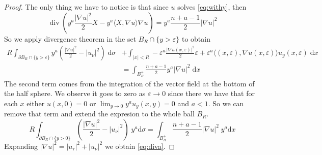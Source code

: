 \documentclass[letterpaper]{article}
\numberwithin{equation}{section}
\newcommand{\abs}[1]{\left\vert#1\right\vert}
\newcommand{\eps}{\varepsilon}
\newcommand{\grad} {\nabla}
\newcommand{\bdary} {\partial}
\newcommand{\dx} {\; \mathrm{d} x}
\newcommand{\dd} {\; \mathrm{d}}
\DeclareMathOperator{\dv}{div}
\newcommand{\party}[1] {#1_y}
\newcommand{\ydd} {\; y^a \mathrm{d}}
\begin{document}
\begin{proof}
The only thing we have to notice is that since $u$ solves \eqref{eq:withy}, then 
\[ \dv \left( y^a \frac{\abs{ \grad u }^2 }{2} X - y^a \langle X , \grad u \rangle \grad u \right) = y^a \frac{n+a-1}{2} \abs{ \grad u }^2 \]
So we apply divergence theorem in the set $B_R \cap \{y > \eps\}$ to obtain
\[ \begin{split}
R \int_{\bdary B_R \cap \{y> \eps \}} y^a \left( \frac{\abs{\grad u}^2} 2 - \abs{u_\nu}^2 \right) \dd \sigma &+ \int_{\abs{x}<R} -\eps^a \frac{\abs{ \grad u(x,\eps) }^2 }{2} \eps + \eps^a \langle (x,\eps),\grad u(x,\eps) \rangle \party u(x,\eps) \dx \\ &= \int_{B_R^+} \frac{n+a-1}{2} y^a \abs{\grad u}^2 \dx 
\end{split}\]
The second term comes from the integration of the vector field at the bottom of the half sphere. We observe it goes to zero as $\eps \to 0$ since there we have that for each $x$ either $u(x,0)=0$ or $\lim_{y \to 0} y^a \party u(x,y) = 0$ and $a<1$. So we can remove that term and extend the expresion to the whole ball $B_R$.
\[ R \int_{\bdary B_R \cap \{y>0\}}  \left( \frac{\abs{\grad u}^2} 2 - \abs{u_\nu}^2 \right) \ydd \sigma = \int_{B_R^+} \frac{n+a-1}{2}  \abs{\grad u}^2 \ydd x \]
Expanding $\abs{\grad u}^2 = \abs{u_\tau}^2 + \abs{u_\nu}^2$ we obtain \eqref{eq:diva}.
\end{proof}
\end{document}

